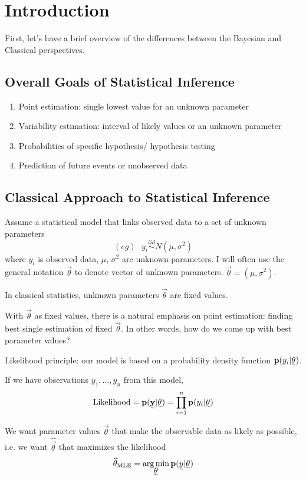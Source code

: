 \section{Introduction}

First, let's have a brief overview of the differences between the Bayesian and Classical perspectives.

\subsection{Overall Goals of Statistical Inference}

\begin{enumerate}
    \item Point estimation: single lowest value for an unknown parameter
    \item Variability estimation: interval of likely values or an unknown parameter
    \item Probabilities of specific hypothesis/ hypothesis testing
    \item Prediction of future events or unobserved data
\end{enumerate}

\subsection{Classical Approach to Statistical Inference}

Assume a statistical model that links observed data to a set of unknown parameters
\[
(eg) ~~~ y_i \stackrel{iid}{\sim}  N(\mu, \sigma^2)
\]
where $y_i$ is observed data, $\mu$, $\sigma^2$ are unknown parameters. I will often use the general notation $\vec{\theta}$ to denote vector of unknown parameters. $\vec{\theta} = (\mu, \sigma^2)$.

In classical statistics, unknown parameters $\vec{\theta}$ are fixed values.

With $\vec{\theta}$ as fixed values, there is a natural emphasis on point estimation: finding best single estimation of fixed $\vec{\theta}$. In other words, how do we come up with best parameter values?

Likelihood principle: our model is based on a probability density function $\p(y_i| \vec{\theta})$.

If we have observations $y_1, \dots, y_n$ from this model, 
\[
\text{Likelihood} = \p(\vec{\y}| \vec{\theta}) = \prod_{i=1}^n \p(y_i| \vec{\theta})
\]

We want parameter values $\vec{\theta}$ that make the observable data as likely as possible, i.e. we want $\hat{\vec{\theta}}$ that maximizes the likelihood
\[
\hat{\theta}_\text{MLE} = \argmin_{\vec{\theta}} \p(\vec{y} | \vec{\theta})
\]

